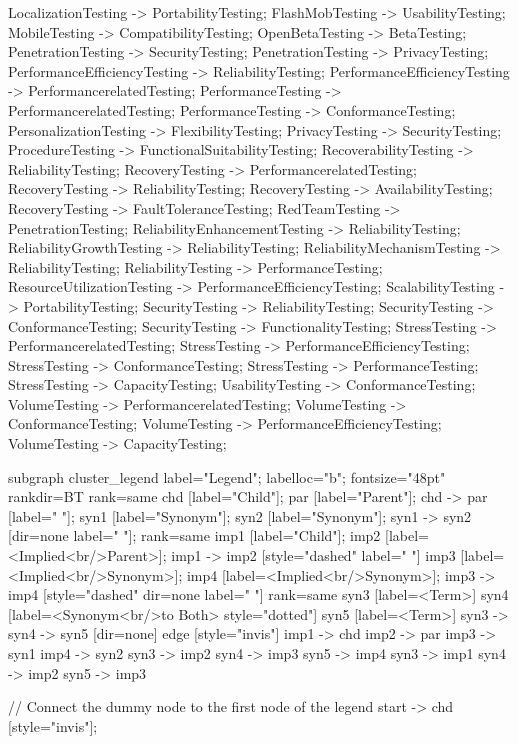 \documentclass{article}
\begin{document}
{LocalizationTesting -> PortabilityTesting;
FlashMobTesting -> UsabilityTesting;
MobileTesting -> CompatibilityTesting;
OpenBetaTesting -> BetaTesting;
PenetrationTesting -> SecurityTesting;
PenetrationTesting -> PrivacyTesting;
PerformanceEfficiencyTesting -> ReliabilityTesting;
PerformanceEfficiencyTesting -> PerformancerelatedTesting;
PerformanceTesting -> PerformancerelatedTesting;
PerformanceTesting -> ConformanceTesting;
PersonalizationTesting -> FlexibilityTesting;
PrivacyTesting -> SecurityTesting;
ProcedureTesting -> FunctionalSuitabilityTesting;
RecoverabilityTesting -> ReliabilityTesting;
RecoveryTesting -> PerformancerelatedTesting;
RecoveryTesting -> ReliabilityTesting;
RecoveryTesting -> AvailabilityTesting;
RecoveryTesting -> FaultToleranceTesting;
RedTeamTesting -> PenetrationTesting;
ReliabilityEnhancementTesting -> ReliabilityTesting;
ReliabilityGrowthTesting -> ReliabilityTesting;
ReliabilityMechanismTesting -> ReliabilityTesting;
ReliabilityTesting -> PerformanceTesting;
ResourceUtilizationTesting -> PerformanceEfficiencyTesting;
ScalabilityTesting -> PortabilityTesting;
SecurityTesting -> ReliabilityTesting;
SecurityTesting -> ConformanceTesting;
SecurityTesting -> FunctionalityTesting;
StressTesting -> PerformancerelatedTesting;
StressTesting -> PerformanceEfficiencyTesting;
StressTesting -> ConformanceTesting;
StressTesting -> PerformanceTesting;
StressTesting -> CapacityTesting;
UsabilityTesting -> ConformanceTesting;
VolumeTesting -> PerformancerelatedTesting;
VolumeTesting -> ConformanceTesting;
VolumeTesting -> PerformanceEfficiencyTesting;
VolumeTesting -> CapacityTesting;

subgraph cluster_legend {
    label="Legend";
    labelloc="b";
    fontsize="48pt"
    rankdir=BT
    {
        rank=same
        chd [label="Child"];
        par [label="Parent"];
        chd -> par [label="                "];
        syn1 [label="Synonym"];
        syn2 [label="Synonym"];
        syn1 -> syn2 [dir=none label="                "];
    }
    {
        rank=same
        imp1 [label="Child"];
        imp2 [label=<Implied<br/>Parent>];
        imp1 -> imp2 [style="dashed" label="                "]
        imp3 [label=<Implied<br/>Synonym>];
        imp4 [label=<Implied<br/>Synonym>];
        imp3 -> imp4 [style="dashed" dir=none label="                "]
    }
    {
        rank=same
        syn3 [label=<Term>]
        syn4 [label=<Synonym<br/>to Both> style="dotted"]
        syn5 [label=<Term>]
        syn3 -> syn4 -> syn5 [dir=none]
    }
    edge [style="invis"]
    imp1 -> chd
    imp2 -> par
    imp3 -> syn1
    imp4 -> syn2
syn3 -> imp2
syn4 -> imp3
syn5 -> imp4
syn3 -> imp1
syn4 -> imp2
syn5 -> imp3
}

// Connect the dummy node to the first node of the legend
start -> chd [style="invis"];
}
\end{document}
